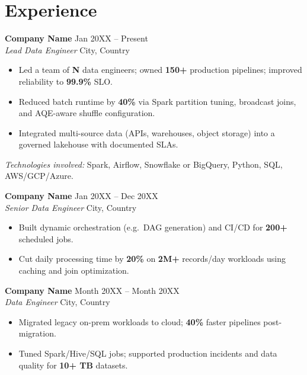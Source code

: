 \documentclass[10pt,letterpaper]{article}
\begin{document}
\section*{Experience}

\textbf{Company Name} \hfill Jan 20XX -- Present \\
\textit{Lead Data Engineer} \hfill City, Country
\begin{itemize}
  \item %
  Led a team of \textbf{N} data engineers; owned \textbf{150+} production pipelines; improved reliability to \textbf{99.9\%} SLO.
  \item %
  Reduced batch runtime by \textbf{40\%} via Spark partition tuning, broadcast joins, and AQE-aware shuffle configuration.
  \item %
  Integrated multi-source data (APIs, warehouses, object storage) into a governed lakehouse with documented SLAs.
\end{itemize}
{\small\textit{Technologies involved:} Spark, Airflow, Snowflake or BigQuery, Python, SQL, AWS/GCP/Azure.}

\vspace{0.35em}

\textbf{Company Name} \hfill Jan 20XX -- Dec 20XX \\
\textit{Senior Data Engineer} \hfill City, Country
\begin{itemize}
  \item Built dynamic orchestration (e.g.\ DAG generation) and CI/CD for \textbf{200+} scheduled jobs.
  \item Cut daily processing time by \textbf{20\%} on \textbf{2M+} records/day workloads using caching and join optimization.
\end{itemize}

\vspace{0.35em}

\textbf{Company Name} \hfill Month 20XX -- Month 20XX \\
\textit{Data Engineer} \hfill City, Country
\begin{itemize}
  \item Migrated legacy on-prem workloads to cloud; \textbf{40\%} faster pipelines post-migration.
  \item Tuned Spark/Hive/SQL jobs; supported production incidents and data quality for \textbf{10+ TB} datasets.
\end{itemize}
\end{document}

